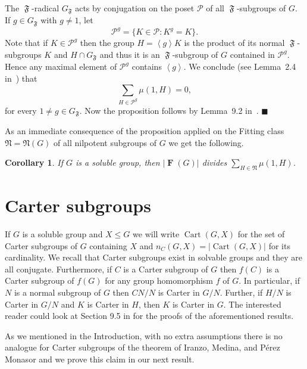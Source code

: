 \documentclass[10pt,a4paper]{amsart}
\numberwithin{equation}{section}
\DeclareMathOperator{\FF}{\mathfrak{F}}
\DeclareMathOperator{\fitt}{\mathbf{F}}
\DeclareMathOperator{\cart}{Cart}
\newcommand{\gensub}[1]{\left\langle{#1}\right\rangle}
\newcommand{\card}[1]{\left\lvert{#1}\right\rvert}
\renewcommand{\leq}{\leqslant}
\newenvironment{proofof}{{\bf {Proof.} }}{\hfill $\blacksquare$ \\}
\def\NN{{\mathfrak N}}
\newtheorem{corollary}[theorem]{Corollary}
\begin{document}
\begin{proofof}
The $\FF$-radical $G_{\FF}$ acts by conjugation on the poset $\mathcal{P}$ of all $\FF$-subgroups of $G$. 
If $g \in G_{\FF}$ with $g \neq 1$, let 
\[
\mathcal{P}^g = \{K \in \mathcal{P} : K^g = K\}. 
\]
Note that if  $K \in \mathcal{P}^g$ then the group 
$H = \gensub{g}K$ is  the product of its normal $\FF$-subgroups $K$ and $H \cap G_{\FF}$  
and thus it is an $\FF$-subgroup  of  $G$ contained in $\mathcal{P}^g$. 
Hence any maximal element of $\mathcal{P}^g$ contains $\gensub{g}$. 
We conclude (see  Lemma~2.4 in~\cite{mobius}) that 
\[
\sum_{H \in \mathcal{P}^g} \mu(1,H) = 0,
\]
for every $1 \neq g \in G_{\FF}$. 
Now the proposition follows by Lemma~9.2 in~\cite{mobius}. 
\end{proofof}

As an immediate consequence of the proposition 
applied on the Fitting class $\NN = \NN(G)$ of all nilpotent subgroups of $G$ 
we get the following.

\begin{corollary}
If $G$  is a soluble group, 
then $\card{\fitt(G)}$ divides $\sum_{H \in \NN} \mu(1,H)$.
\end{corollary}








\section{Carter subgroups}\label{Sec:3}

If $G$ is a soluble group and $X \leq G$ we will write $\cart(G, X)$ 
for the set of Carter subgroups of $G$ containing $X$ and $n_C(G,X) = \card{\cart(G, X)}$ 
for its  cardinality.
We recall that  Carter subgroups exist in solvable groups and they are all conjugate. Furthermore,  if $C$ is a Carter subgroup of $G$ 
then $f(C)$ is a Carter subgroup of $f(G)$ 
for any group homomorphism $f$ of $G$. 
In particular, if $N$ is a normal subgroup of $G$ then $CN/N$ is Carter in $G/N$. 
Further, if $H/N$ is Carter in $G/N$ and $K$ is Carter in $H$, then $K$ is Carter in $G$. The interested reader could look at Section 9.5 in \cite{Robinson1982ACI} for the proofs of the  aforementioned results.  

As we mentioned in the Introduction,
with no extra assumptions 
there is no analogue for Carter subgroups of the theorem
of Iranzo, Medina, and P\'{e}rez Monasor
and we prove this claim in our next result.
\end{document}
